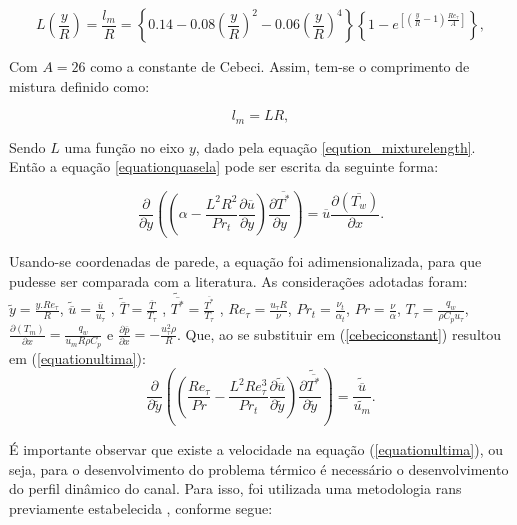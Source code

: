 \begin{equation}\label{eqution_mixturelength}
L\left(\frac{y}{R}\right)  = \frac{l_m}{R} = \left\{ 0.14 - 0.08 \left(\frac{y}{R}\right)^2 - 0.06\left(\frac{y}{R}\right)^4\right\}\left\{  1 - e^{[(\frac{y}{R} - 1) \frac{Re_\tau}{A}]}\right\},
\end{equation}

Com $A = 26$ como a constante de Cebeci. Assim, tem-se o comprimento de mistura definido como:

\begin{equation}
l_m = L R,
\end{equation}

Sendo $L$ uma função no eixo $y$, dado pela equação \ref{eqution_mixturelength}. Então a equação \ref{equationquasela} pode ser escrita da seguinte forma:

\begin{equation}\label{cebeciconstant}
{\frac{\partial{}}{\partial{y}}} \left( \left( \alpha   
- \frac{{L}^2 R ^2}{Pr_t}\frac{\partial \overline{u}}{\partial y} \right) \frac{\partial \overline{T^\ast}}{\partial y} \right)
= 
\overline{u}\frac{\partial{}\left(\overline{T_w}\right)  }{\partial{x}}.
\end{equation}

Usando-se coordenadas de parede, a equação foi adimensionalizada, para que pudesse ser comparada com a literatura. As considerações adotadas foram: $ \tilde{y} = \frac{y . Re_\tau}{R} $, $ \tilde{\overline{u}} = \frac{\overline{u}}{u_\tau} $ , $ \tilde{\overline{T}} = \frac{\overline{T}}{T_\tau} $ , $ \tilde{\overline{T^\ast}} = \frac{\overline{T^\ast}}{T_\tau} $ , $Re_\tau = \frac{u_\tau R}{\nu}$, $Pr_t = \frac{\nu_t}{\alpha_t}$, $Pr = \frac{\nu}{\alpha}$, $T_\tau = \frac{q_w}{\rho C_p u_\tau}$, $\frac{\partial{\left(T_m\right)}}{\partial{x}} = \frac{q_w}{u_m  R \rho  C_p } $ e $\frac{\partial \overline{p}}{\partial x} = - \frac{u_\tau^2 \rho}{R} $. Que, ao se substituir em (\ref{cebeciconstant}) resultou em (\ref{equationultima}):
\\
\begin{equation}\label{equationultima}
{\frac{\partial{}}{\partial{\tilde{y}}}} \left( \left( \frac{Re_\tau}{Pr}   
- \frac{{L}^2 Re_\tau ^3}{Pr_t}\frac{\partial \tilde{\overline{u}}}{\partial \tilde{y}} \right) \frac{\partial \tilde{\overline{T^\ast}}}{\partial \tilde{y}} \right)
= 
\frac{\tilde{\overline{u}}}{\tilde{u_m}}.
\end{equation}

É importante observar que existe a velocidade na equação (\ref{equationultima}), ou seja, para o desenvolvimento do problema térmico é necessário o desenvolvimento do perfil dinâmico do canal. Para isso, foi utilizada uma metodologia rans previamente estabelecida \cite{luigi}, conforme segue:

